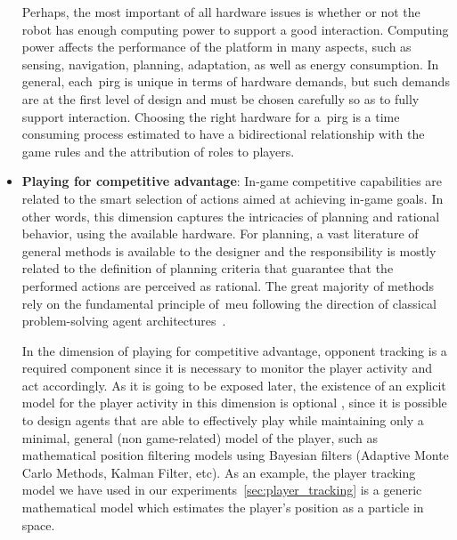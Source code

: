\begin{itemize}[leftmargin=*,labelsep=5.8mm]
Perhaps, the most important of all hardware issues is whether or not the robot has enough computing power to support a good interaction. Computing power affects the performance of the platform in many aspects, such as sensing, navigation, planning, adaptation, as well as energy consumption. In general, each~\gls{pirg} is unique in terms of hardware demands, but such demands are at the first level of design and must be chosen carefully so as to fully support interaction. Choosing the right hardware for a~\gls{pirg} is a time consuming process estimated to have a bidirectional relationship with the game rules and the attribution of roles to players.

\item \textbf{Playing for competitive advantage}: In-game competitive capabilities are related to the smart selection of actions aimed at achieving in-game goals. In other words, this dimension captures the intricacies of planning and rational behavior, using the available hardware. %
For planning, a vast literature of general methods is available to the designer and the responsibility is mostly related to the definition of planning criteria that guarantee that the performed actions are perceived as rational. The great majority of methods rely on the fundamental principle of~\gls{meu} following the direction of classical problem-solving agent architectures~\citep{russell_artificial_2009}.

In the dimension of playing for competitive advantage, opponent tracking is a required component since it is necessary to monitor the player activity and act accordingly. As it is going to be exposed later, the existence of an explicit model for the player activity in this dimension is optional %
, since it is possible to design agents that are able to effectively play while maintaining only a minimal, general (non game-related) model of the player, such as mathematical position filtering models using Bayesian filters (\eg Adaptive Monte Carlo Methods, Kalman Filter, etc). As an example, the player tracking model we have used in our experiments~\ref{sec:player_tracking} is a generic mathematical model which estimates the player's position as a particle in space. %


\end{itemize}
